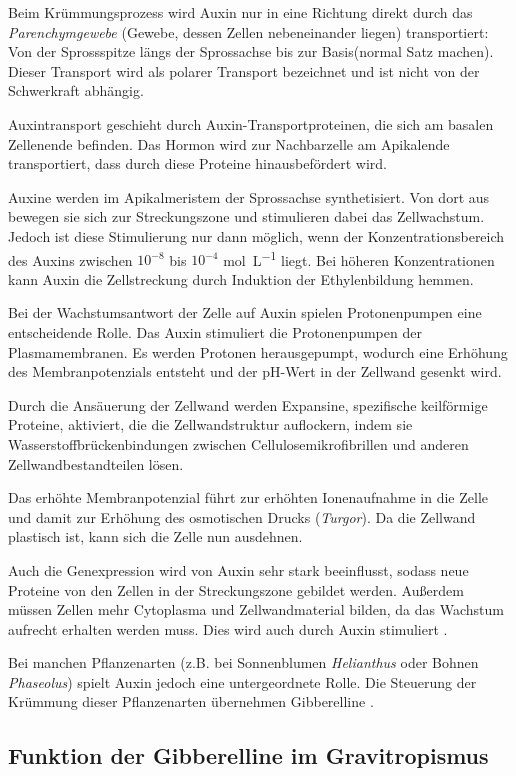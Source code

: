 \documentclass[
11pt, 
ngerman,
listof=totocnumbered,
oneside,
bibliography=totocnumbered,
abstracton
]{scrreprt}
\begin{document}
Beim Krümmungsprozess wird Auxin nur in eine Richtung direkt durch das \emph{Parenchymgewebe} (Gewebe, dessen Zellen nebeneinander liegen) transportiert: Von der Sprossspitze längs der Sprossachse bis zur Basis(normal Satz machen). Dieser Transport wird als polarer Transport bezeichnet und ist nicht von der Schwerkraft abhängig.

Auxintransport geschieht durch Auxin-Transportproteinen, die sich am basalen Zellenende befinden.
Das Hormon wird zur Nachbarzelle am Apikalende transportiert, dass durch diese Proteine hinausbefördert wird.

Auxine werden im Apikalmeristem der Sprossachse synthetisiert. Von dort aus bewegen sie sich zur Streckungszone und stimulieren dabei das Zellwachstum.
Jedoch ist diese Stimulierung nur dann möglich, wenn der Konzentrationsbereich des Auxins zwischen $10^{-8}$ bis $10^{-4}$ \si{\mole\per\L} liegt. Bei höheren Konzentrationen kann Auxin die Zellstreckung durch Induktion der Ethylenbildung hemmen.

Bei der Wachstumsantwort der Zelle auf Auxin spielen Protonenpumpen eine entscheidende Rolle. Das Auxin stimuliert die Protonenpumpen der Plasmamembranen. Es werden Protonen herausgepumpt, wodurch eine Erhöhung des Membranpotenzials entsteht und der pH-Wert in der Zellwand gesenkt wird. 

Durch die Ansäuerung  der Zellwand werden Expansine, spezifische keilförmige Proteine, aktiviert, die die Zellwandstruktur auflockern, indem sie Wasserstoffbrückenbindungen zwischen Cellulosemikrofibrillen und anderen Zellwandbestandteilen lösen.

Das erhöhte Membranpotenzial führt zur erhöhten Ionenaufnahme in die Zelle und damit zur Erhöhung des osmotischen Drucks (\emph{Turgor}). Da die Zellwand plastisch ist, kann sich die Zelle nun ausdehnen. 

Auch die Genexpression wird von Auxin sehr stark beeinflusst, sodass neue Proteine von den Zellen in der Streckungszone gebildet werden.
Außerdem müssen Zellen mehr Cytoplasma und Zellwandmaterial bilden, da das Wachstum aufrecht erhalten werden muss. Dies wird auch durch Auxin stimuliert \parencite[1118ff]{campbell}.

Bei manchen Pflanzenarten (z.B. bei Sonnenblumen \emph{Helianthus} oder Bohnen \emph{Phaseolus}) spielt Auxin jedoch eine untergeordnete Rolle.
Die Steuerung der Krümmung dieser Pflanzenarten übernehmen Gibberelline \parencite[502--503]{Nultsch}.
 
\subsection{Funktion der Gibberelline im Gravitropismus}
\end{document}
